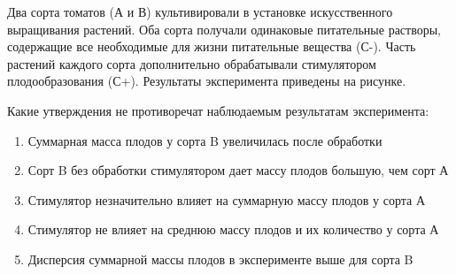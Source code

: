 
Два сорта томатов (А и В) культивировали в
установке искусственного выращивания растений. Оба сорта получали одинаковые
питательные растворы, содержащие все необходимые для жизни питательные вещества
(С-). Часть растений каждого сорта дополнительно обрабатывали стимулятором
плодообразования (С+). Результаты эксперимента приведены на рисунке.


Какие утверждения не противоречат
наблюдаемым результатам эксперимента:

\begin{enumerate}
    \item Суммарная масса плодов у сорта B увеличилась после обработки
    \item Сорт B без обработки стимулятором дает массу плодов большую, чем сорт А
    \item Стимулятор незначительно влияет на суммарную массу плодов у сорта А
    \item Стимулятор не влияет на среднюю массу плодов и их количество у сорта А
    \item Дисперсия суммарной массы плодов в эксперименте выше для сорта B
\end{enumerate}



